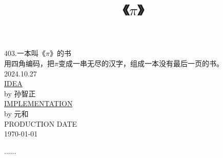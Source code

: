 \documentclass[12pt, oneside]{book}
\title{《$\pi$》}
\author{}
\date{}
\begin{document}
	\maketitle

	{\centering
	\quad
	\vspace{4em}
	
	403.一本叫《$\pi$》的书 \\
	用四角编码，把$\pi$变成一串无尽的汉字，组成一本没有最后一页的书。\\
	2024.10.27 \\
	
	\vspace{1em}
	\href{https://mp.weixin.qq.com/s/LyUCRKytMIxOkjeeRd1OYg}{IDEA} \\ 
	by 孙智正 \\ 
	
	\vspace{2em}
	\href{https://github.com/yuanhes/4CornerIndex-to-Text}{IMPLEMENTATION} \\
	by 元和 \\ 
	
	\vspace{3em}
	PRODUCTION DATE \\
	\today
	
	}

	
	\mainmatter
	
	\setcounter{page}{1} %
	
	
	
	......
	
\end{document}
